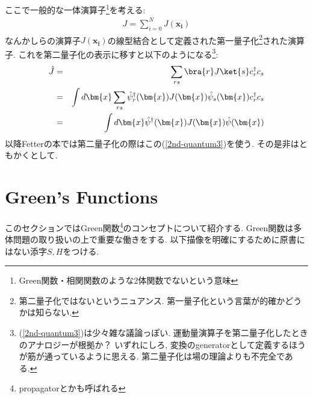 \documentclass[10.5pt,a4paper]{jreport}
\begin{document}
ここで一般的な一体演算子\footnote{Green関数・相関関数のような2体関数でないという意味}を考える:
\begin{eqnarray}
  J = \sum_{i = 0}^NJ(\bm{x_i})
\end{eqnarray}
なんかしらの演算子$J(\bm{x_i})$の線型結合として定義された第一量子化\footnote{第二量子化ではないというニュアンス. 第一量子化という言葉が的確かどうかは知らない. }された演算子. これを第二量子化の表示に移すと以下のようになる\footnote{(\ref{2nd-quantum3})は少々雑な議論っぽい. 運動量演算子を第二量子化したときのアナロジーが根拠か？ いずれにしろ, 変換のgeneratorとして定義するほうが筋が通っているように思える. 第二量子化は場の理論よりも不完全である. }:
\begin{eqnarray}
  \hat{J} &=& \sum_{rs}\bra{r}J\ket{s}c_r^\dagger c_s\label{2nd-quantum3}\\
  &=& \int d\bm{x}\sum_{rs}\hat{\psi}^\dagger_r(\bm{x})J(\bm{x})\hat{\psi}_s(\bm{x})c_r^\dagger c_s\\
  &=& \int d\bm{x}\hat{\psi}^\dagger(\bm{x})J(\bm{x})\hat{\psi}(\bm{x})
\end{eqnarray}
以降Fetterの本では第二量子化の際はこの(\ref{2nd-quantum3})を使う. その是非はともかくとして. 

\section{Green's Functions}
このセクションではGreen関数\footnote{propagatorとかも呼ばれる}のコンセプトについて紹介する. Green関数は多体問題の取り扱いの上で重要な働きをする. 以下描像を明確にするために原書にはない添字$S, H$をつける. 
\end{document}
